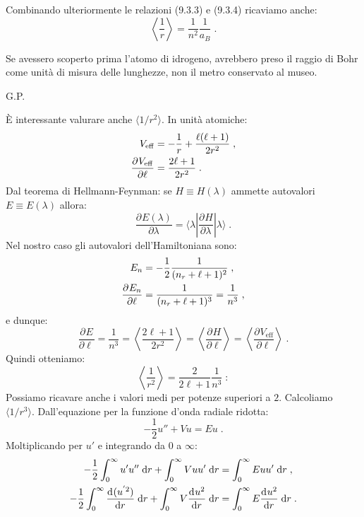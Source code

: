 \documentclass[12pt,a4paper]{report}
\theoremstyle{definition}
\newcommand{\pdev}[3][]{\frac{\partial^{#1} #2}{\partial #3^{#1}}}
\newcommand{\dev}[3][]{\frac{\mathrm{d}^{#1} #2}{\mathrm{d} #3^{#1}}}
\numberwithin{equation}{section}
\newcommand{\diff}[1][]{\mathrm{d}#1}
\newcommand{\bra}{\langle}
\newcommand{\ket}{\rangle}
\begin{document}
Combinando ulteriormente le relazioni (9.3.3) e (9.3.4) ricaviamo anche:
\begin{equation}
\left\langle \frac{1}{r}\right\rangle =\frac{1}{n^2}\frac{1}{a_B}\;.
\end{equation}
\begin{quoting}
Se avessero scoperto prima l'atomo di idrogeno, avrebbero preso il raggio di Bohr come unità di misura delle lunghezze, non il metro conservato al museo.
\begin{flushright}
G.P.
\end{flushright}
\end{quoting}
È interessante valurare anche $\bra 1/r^2 \ket$. In unità atomiche:
\begin{align}
V_{\mathrm{eff}}&=-\frac{1}{r}+\frac{\ell(\ell+1)}{2r^2} \notag\;, \\
\pdev{V_{\mathrm{eff}}}{\ell} &= \frac{2\ell+1}{2r^2}\;.
\end{align}
Dal teorema di Hellmann-Feynman: se $H\equiv H(\lambda)$ ammette autovalori $E\equiv E(\lambda)$ allora:
\begin{equation}
\pdev{E(\lambda)}{\lambda}=\bra \lambda|\pdev{H}{\lambda}|\lambda \ket\;.
\end{equation}
Nel nostro caso gli autovalori dell'Hamiltoniana sono:
\begin{align}
E_n &=-\frac{1}{2}\frac{1}{(n_r+\ell+1)^2} \notag\;, \\
\pdev{E_n}{\ell}&=\frac{1}{(n_r+\ell+1)^3}=\frac{1}{n^3}\;,
\end{align}
e dunque:
\begin{equation}
\pdev{E}{\ell}=\frac{1}{n^3}=\left\langle \frac{2\ell+1}{2r^2}\right\rangle =\left\langle \pdev{H}{\ell}\right\rangle=\left\langle \pdev{V_{\mathrm{eff}}}{\ell} \right\rangle\;.
\end{equation}
Quindi otteniamo:
\begin{equation}
\left\langle \frac{1}{r^2} \right\rangle= \frac{2}{2\ell+1}\frac{1}{n^3}\;:
\end{equation}
Possiamo ricavare anche i valori medi per potenze superiori a $2$. Calcoliamo $\bra 1/r^3\ket$. Dall'equazione per la funzione d'onda radiale ridotta:
\begin{equation}
-\frac{1}{2}u''+Vu=Eu\;.
\end{equation}
Moltiplicando per $u'$ e integrando da $0$ a $\infty$:
\begin{align}
-\frac{1}{2}\int_0^{\infty} u'u''\;\diff{r}+\int_0^{\infty} Vuu'\;\diff{r} &= \int_0^{\infty} Euu'\;\diff{r}\;, \notag \\
-\frac{1}{2}\int_0^{\infty}\dev{(u^{'2})}{r}\;\diff{r}+\int_0^{\infty} V\dev{u^2}{r}\;\diff{r} &= \int_0^{\infty} E \dev{u^2}{r}\;\diff{r}\;.
\end{align}
\end{document}
